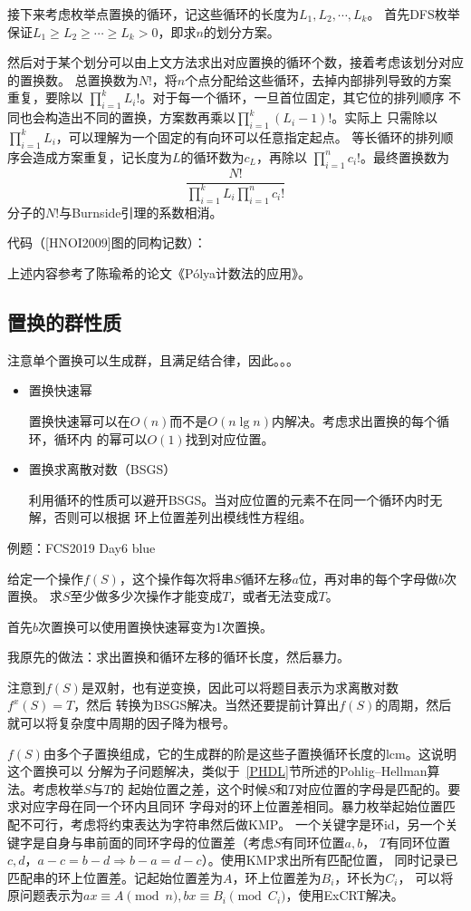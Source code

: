 接下来考虑枚举点置换的循环，记这些循环的长度为$L_1,L_2,\cdots,L_k$。
首先DFS枚举保证$L_1\geq L_2 \geq \cdots \geq L_k>0$，即求$n$的划分方案。

然后对于某个划分可以由上文方法求出对应置换的循环个数，接着考虑该划分对应的置换数。
总置换数为$N!$，将$n$个点分配给这些循环，去掉内部排列导致的方案重复，要除以
$\displaystyle \prod_{i=1}^k{L_i!}$。对于每一个循环，一旦首位固定，其它位的排列顺序
不同也会构造出不同的置换，方案数再乘以$\displaystyle \prod_{i=1}^k{(L_i-1)!}$。实际上
只需除以$\displaystyle \prod_{i=1}^k{L_i}$，可以理解为一个固定的有向环可以任意指定起点。
等长循环的排列顺序会造成方案重复，记长度为$L$的循环数为$c_L$，再除以
$\displaystyle \prod_{i=1}^n{c_i!}$。最终置换数为
\begin{displaymath}
	\frac{N!}{\prod_{i=1}^k{L_i}\prod_{i=1}^n{c_i!}}
\end{displaymath}
分子的$N!$与Burnside引理的系数相消。

代码（[HNOI2009]图的同构记数）：


上述内容参考了陈瑜希的论文《Pólya计数法的应用》。
\subsection{置换的群性质}
注意单个置换可以生成群，且满足结合律，因此。。。

\begin{itemize}
	\item 置换快速幂

	置换快速幂可以在$O(n)$而不是$O(n\lg n)$内解决。考虑求出置换的每个循环，循环内
	的幂可以$O(1)$找到对应位置。
	\item 置换求离散对数（BSGS）

	利用循环的性质可以避开BSGS。当对应位置的元素不在同一个循环内时无解，否则可以根据
	环上位置差列出模线性方程组。
\end{itemize}


例题：FCS2019 Day6 blue

给定一个操作$f(S)$，这个操作每次将串$S$循环左移$a$位，再对串的每个字母做$b$次置换。
求$S$至少做多少次操作才能变成$T$，或者无法变成$T$。

首先$b$次置换可以使用置换快速幂变为1次置换。

我原先的做法：求出置换和循环左移的循环长度，然后暴力。

注意到$f(S)$是双射，也有逆变换，因此可以将题目表示为求离散对数$f^x(S)=T$，然后
转换为BSGS解决。当然还要提前计算出$f(S)$的周期，然后就可以将复杂度中周期的因子降为根号。

$f(S)$由多个子置换组成，它的生成群的阶是这些子置换循环长度的lcm。这说明这个置换可以
分解为子问题解决，类似于~\ref{PHDL}节所述的Pohlig–Hellman算法。考虑枚举$S$与$T$的
起始位置之差，这个时候$S$和$T$对应位置的字母是匹配的。要求对应字母在同一个环内且同环
字母对的环上位置差相同。暴力枚举起始位置匹配不可行，考虑将约束表达为字符串然后做KMP。
一个关键字是环id，另一个关键字是自身与串前面的同环字母的位置差（考虑$S$有同环位置$a,b$，
$T$有同环位置$c,d$，$a-c=b-d\Rightarrow b-a=d-c$）。使用KMP求出所有匹配位置，
同时记录已匹配串的环上位置差。记起始位置差为$A$，环上位置差为$B_i$，环长为$C_i$，
可以将原问题表示为$ax\equiv A\pmod{n},bx\equiv B_i\pmod{C_i}$，使用ExCRT解决。
